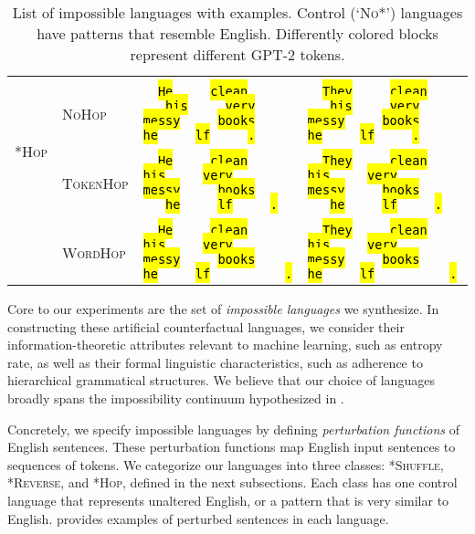 \documentclass[11pt]{article}
\newcommand{\singularmarker}{%
  \setlength{\fboxsep}{1pt}%
  \fbox{\texttt{S}}%
}
\newcommand{\pluralmarker}{%
  \setlength{\fboxsep}{1pt}%
  \fbox{\texttt{P}}%
}
\newcommand{\highlight}[2]{%
    \begingroup
    \definecolor{hlcolor}{HTML}{#1}%
    \sethlcolor{hlcolor}%
    \hl{#2}%
    \endgroup
}
\newcommand{\tokenHe}{%
  \highlight{FDFD95}{He}%
}
\newcommand{\tokenThey}{%
  \highlight{FDFD95}{They}%
}
\newcommand{\tokenclean}{%
  \highlight{FDE4CF}{ clean}%
}
\newcommand{\tokenhis}{%
  \highlight{FFCFD2}{ his}%
}
\newcommand{\tokenvery}{%
  \highlight{F1C0E8}{ very}%
}
\newcommand{\tokenmessy}{%
  \highlight{CFBAF0}{ messy}%
}
\newcommand{\tokenbooks}{%
  \highlight{A3C4F3}{ books}%
}
\newcommand{\tokenhe}{%
  \highlight{90DBF4}{he}%
}
\newcommand{\tokenlf}{%
  \highlight{98F5E1}{lf}%
}
\newcommand{\tokenperiod}{%
  \highlight{B9FBC0}{.}%
}
\newcommand{\tokensing}{%
  \highlight{FF77E6}{\singularmarker}%
}
\newcommand{\tokenplur}{%
  \highlight{3EC8FF}{\pluralmarker}%
}
\begin{document}
\begin{table*}
{\begin{tabular}{l|l|l|l}
    & & & \\[-1em]
    \multirow{4}{*}{\textsc{*Hop}} & \textcolor{NoHop}{\textsc{NoHop}}               & \texttt{\tokenHe\,\tokenclean\,\tokensing\,\tokenhis\,\tokenvery\,\tokenmessy\,\tokenbooks\,\tokenhe\,\tokenlf\,\tokenperiod} &  \texttt{\tokenThey\,\tokenclean\,\tokenplur\,\tokenhis\,\tokenvery\,\tokenmessy\,\tokenbooks\,\tokenhe\,\tokenlf\,\tokenperiod} \\[3pt] \cline{2-4}
    & & & \\[-1em]
    & \textcolor{tokenhop}{\textsc{TokenHop}}                & \texttt{\tokenHe\,\tokenclean\,\tokenhis\,\tokenvery\,\tokenmessy\,\tokenbooks\,\tokensing\,\tokenhe\,\tokenlf\,\tokenperiod} &  \texttt{\tokenThey\,\tokenclean\,\tokenhis\,\tokenvery\,\tokenmessy\,\tokenbooks\,\tokenplur\,\tokenhe\,\tokenlf\,\tokenperiod} \\[3pt] \cline{2-4}
    & & & \\[-1em]
    & \textcolor{wordhop}{\textsc{WordHop}} & \texttt{\tokenHe\,\tokenclean\,\tokenhis\,\tokenvery\,\tokenmessy\,\tokenbooks\,\tokenhe\,\tokenlf\,\tokensing\,\tokenperiod} &  \texttt{\tokenThey\,\tokenclean\,\tokenhis\,\tokenvery\,\tokenmessy\,\tokenbooks\,\tokenhe\,\tokenlf\,\tokenplur\,\tokenperiod} \\[3pt]
    \toprule
    \end{tabular}
  }
  \caption{List of impossible languages with examples. Control (`\textsc{No*}') languages have patterns that resemble English. Differently colored
  blocks represent different GPT-2 tokens. }
  \label{tab:perturbations}
\end{table*}

Core to our experiments are the set of \emph{impossible languages} we synthesize. In constructing these artificial counterfactual languages, we consider their information-theoretic attributes relevant to machine learning, such as entropy rate, as well as their formal linguistic characteristics, such as adherence to hierarchical grammatical structures. We believe that our choice of languages broadly spans the impossibility continuum hypothesized in .

Concretely, we specify impossible languages by defining \emph{perturbation functions} of English sentences. These perturbation functions map English input sentences to sequences of tokens. We categorize our languages into three classes: \textsc{*Shuffle}, \textsc{*Reverse}, and \textsc{*Hop}, defined in the next subsections. Each class has one control language that represents unaltered English, or a pattern that is very similar to English.  provides examples of perturbed sentences in each language.
\end{document}
